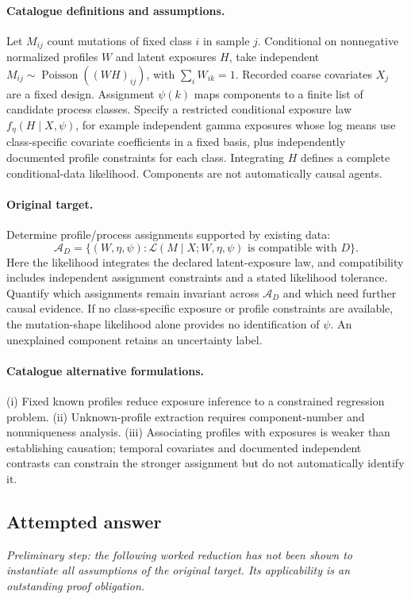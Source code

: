 \documentclass[11pt]{article}
\begin{document}
\paragraph{Catalogue definitions and assumptions.}
Let $M_{ij}$ count mutations of fixed class $i$ in sample $j$. Conditional on nonnegative normalized profiles $W$ and latent exposures $H$, take independent $M_{ij}\sim\operatorname{Poisson}((WH)_{ij})$, with $\sum_iW_{ik}=1$. Recorded coarse covariates $X_j$ are a fixed design. Assignment $\psi(k)$ maps components to a finite list of candidate process classes. Specify a restricted conditional exposure law $f_\eta(H\mid X,\psi)$, for example independent gamma exposures whose log means use class-specific covariate coefficients in a fixed basis, plus independently documented profile constraints for each class. Integrating $H$ defines a complete conditional-data likelihood. Components are not automatically causal agents.
\paragraph{Original target.}
Determine profile/process assignments supported by existing data:
\[\mathcal A_D=\{(W,\eta,\psi):\mathcal L(M\mid X;W,\eta,\psi)
\text{ is compatible with }D\}.\]
Here the likelihood integrates the declared latent-exposure law, and compatibility includes independent assignment constraints and a stated likelihood tolerance. Quantify which assignments remain invariant across $\mathcal A_D$ and which need further causal evidence. If no class-specific exposure or profile constraints are available, the mutation-shape likelihood alone provides no identification of $\psi$. An unexplained component retains an uncertainty label.
\paragraph{Catalogue alternative formulations.}
(i) Fixed known profiles reduce exposure inference to a constrained regression problem. (ii) Unknown-profile extraction requires component-number and nonuniqueness analysis. (iii) Associating profiles with exposures is weaker than establishing causation; temporal covariates and documented independent contrasts can constrain the stronger assignment but do not automatically identify it.
\subsection{Attempted answer}
\noindent\emph{Preliminary step: the following worked reduction has not been shown to instantiate all assumptions of the original target. Its applicability is an outstanding proof obligation.}
\end{document}
